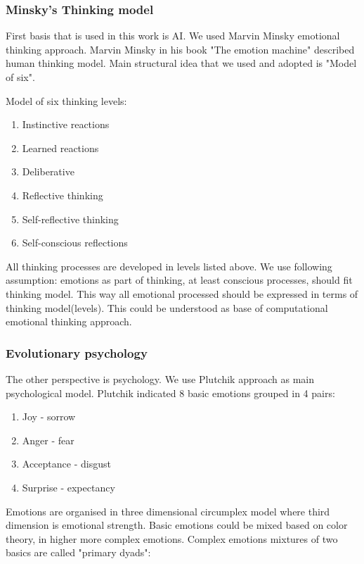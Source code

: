 \subsubsection{Minsky's Thinking model}

First basis that is used in this work is  AI. We used Marvin Minsky emotional thinking approach.
Marvin Minsky in his book "The emotion machine"\cite{emotionmachine} described human thinking model. Main structural idea that we used and adopted is "Model of six".

Model of six thinking levels:

\begin{enumerate}
\item  Instinctive reactions
\item  Learned reactions
\item  Deliberative
\item  Reflective thinking
\item  Self-reflective thinking
\item  Self-conscious reflections
\end{enumerate}

All thinking processes are developed in levels listed above. We use following assumption: emotions as part of thinking, at least conscious processes, should fit thinking model. This way all emotional processed should be expressed in terms of thinking model(levels). This could be understood as base of computational emotional thinking approach.

\subsubsection{Evolutionary psychology}

The other perspective is psychology.  We use Plutchik approach\cite{natureofemotions} as main psychological model. Plutchik indicated 8 basic emotions grouped in 4 pairs:

\begin{enumerate}
\item  Joy - sorrow
\item  Anger - fear
\item  Acceptance - disgust
\item  Surprise - expectancy
\end{enumerate}

Emotions are organised in three dimensional circumplex model where third dimension is emotional strength. Basic emotions could be mixed based on color theory, in higher more complex emotions. Complex emotions mixtures of two basics are called "primary dyads":

